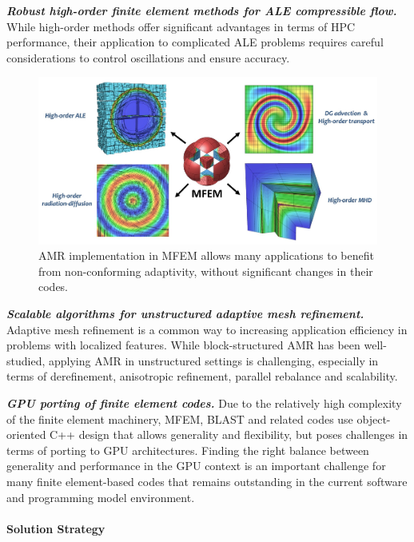 \noindent
{\bf \em Robust high-order finite element methods for ALE compressible flow.}
While high-order methods offer significant advantages in terms of HPC performance,
their application to complicated ALE problems requires careful considerations to
control oscillations and ensure accuracy.

\begin{figure}[htb]
\centering
\includegraphics[width=\textwidth]{projects/2.3.6-NNSA/2.3.6.02-LLNL-ATDM/mfem-amr}
\caption{\label{fig:mfem-amr}AMR implementation in MFEM allows many applications to benefit from non-conforming adaptivity, without significant changes in their codes.}
\end{figure}

\noindent
{\bf \em Scalable algorithms for unstructured adaptive mesh refinement.}
Adaptive mesh refinement is a common way to increasing application efficiency
in problems with localized features. While block-structured AMR has been
well-studied, applying AMR in unstructured settings is challenging, especially
in terms of derefinement, anisotropic refinement, parallel rebalance and
scalability.

\noindent
{\bf \em GPU porting of finite element codes.}
Due to the relatively high complexity of the finite element machinery, MFEM,
BLAST and related codes use object-oriented C++ design that allows generality
and flexibility, but poses challenges in terms of porting to GPU architectures.
Finding the right balance between generality and performance in the GPU context
is an important challenge for many finite element-based codes that remains
outstanding in the current software and programming model environment.

\paragraph{Solution Strategy}

